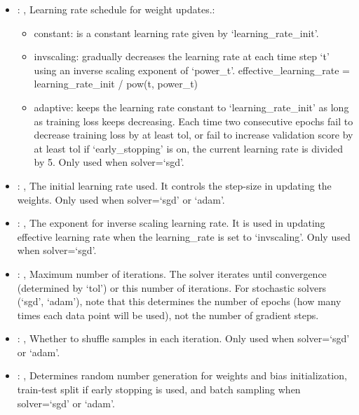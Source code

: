\begin{itemize}
    \item {}: , 
      Learning rate schedule for weight updates.:
      \begin{itemize}                                                   \item constant: is a
      constant learning rate given by `learning\_rate\_init'.
      \item invscaling: gradually decreases the learning rate at each time step `t' using
      an inverse scaling exponent of `power\_t'. effective\_learning\_rate = learning\_rate\_init /
      pow(t, power\_t)                                                   \item adaptive: keeps the
      learning rate constant to `learning\_rate\_init' as long as training
      loss keeps decreasing. Each time two consecutive epochs fail to decrease training loss by at
      least tol, or fail to increase validation score by at least tol if `early\_stopping' is on,
      the current learning rate is divided by 5. Only used when solver=`sgd'.
      \end{itemize}

    \item {}: , 
      The initial learning rate used. It controls the step-size in updating the weights.
      Only used when solver=`sgd' or `adam'.

    \item {}: , 
      The exponent for inverse scaling learning rate. It is used in updating effective
      learning rate when the learning\_rate is set to `invscaling'. Only used when solver=`sgd'.

    \item {}: , 
      Maximum number of iterations. The solver iterates until convergence
      (determined by `tol') or this number of iterations. For stochastic solvers (`sgd', `adam'),
      note that this determines the number of epochs (how many times each data point will be used),
      not the number of gradient steps.

    \item {}: , 
      Whether to shuffle samples in each iteration. Only used when solver=`sgd' or `adam'.

    \item {}: , 
      Determines random number generation for weights and bias initialization,
      train-test split if early stopping is used, and batch sampling when solver=`sgd' or `adam'.


\end{itemize}
